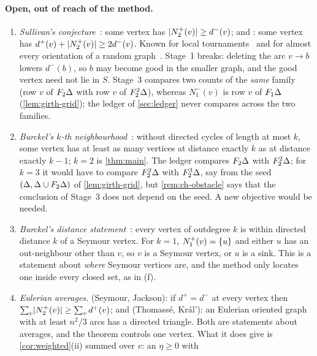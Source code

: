 \paragraph{Open, out of reach of the method.}
\begin{enumerate}[label=(\alph*),leftmargin=2em,start=9]
\item \emph{Sullivan's conjecture}~\cite[Conjecture~6.6]{Sullivan2006}: some vertex has
$\lvert N^+_2(v)\rvert\ge d^-(v)$; and \cite[Conjecture~6.4]{Sullivan2006}: some vertex has
$d^+(v)+\lvert N^+_2(v)\rvert\ge2d^-(v)$. Known for local tournaments~\cite{LiLiang2018} and
for almost every orientation of a random graph~\cite{EspunyDiazEtAl2025}. Stage~1
breaks: deleting the arc $v\to b$ lowers $d^-(b)$, so $b$ may become good in the smaller
graph, and the good vertex need not lie in $S$. Stage~3 compares two counts of the
\emph{same} family (row $v$ of $F_2\Delta$ with row $v$ of $F_2^2\Delta$), whereas
$N^-_1(v)$ is row $v$ of $F_1\Delta$ (\cref{lem:girth-grid}); the ledger of
\cref{sec:ledger} never compares across the two families.
\item \emph{Burckel's $k$-th neighbourhood}~\cite[Conjecture~6.13]{Sullivan2006}: without
directed cycles of length at most $k$, some vertex has at least as many vertices at
distance exactly $k$ as at distance exactly $k-1$; $k=2$ is \cref{thm:main}. The ledger
compares $F_2\Delta$ with $F_2^2\Delta$; for $k=3$ it would have to compare
$F_2^2\Delta$ with $F_2^3\Delta$, say from the seed $(\Delta,\Delta\cup F_2\Delta)$ of
\cref{lem:girth-grid}, but \cref{rem:ch-obstacle} says that the conclusion of Stage~3
does not depend on the seed. A new objective would be needed.
\item \emph{Burckel's distance statement}~\cite[Conjecture~6.14]{Sullivan2006}: every
vertex of outdegree $k$ is within directed distance $k$ of a Seymour vertex. For $k=1$,
$N^+_1(v)=\{u\}$ and either $u$ has an out-neighbour other than $v$, so $v$ is a Seymour
vertex, or $u$ is a sink. This is a statement about \emph{where} Seymour vertices are,
and the method only locates one inside every closed set, as in (f).
\item \emph{Eulerian averages.} \cite[Conjecture~6.15]{Sullivan2006} (Seymour, Jackson):
if $d^+=d^-$ at every vertex then $\sum_v\lvert N^+_2(v)\rvert\ge\sum_vd^+(v)$;
and \cite[Conjecture~6.16]{Sullivan2006} (Thomass\'e, Kr\'al'): an Eulerian oriented
graph with at least $n^2/3$ arcs has a directed triangle. Both are statements about
averages, and the theorem controls one vertex. What it does give is
\cref{cor:weighted}(ii) summed over $v$: an $\eta\ge0$ with

\end{enumerate}
